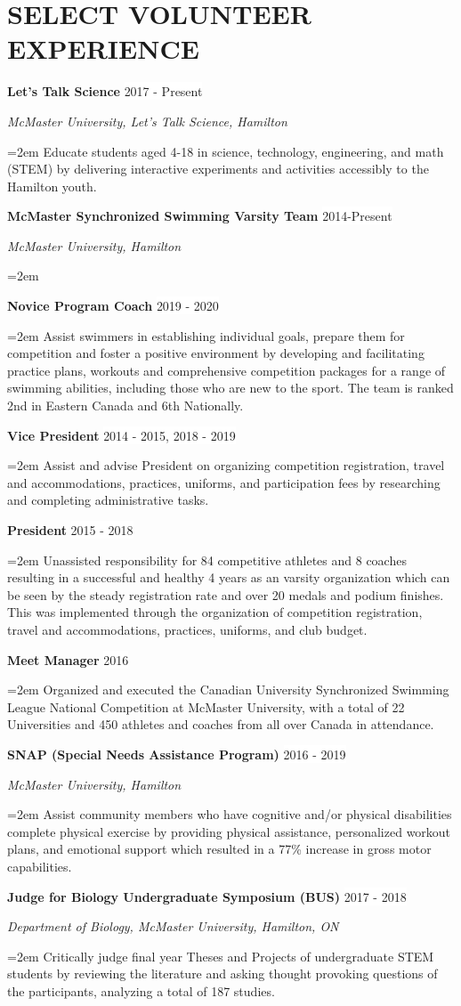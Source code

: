 \documentclass[paper=a4,fontsize=11pt]{scrartcl}	 			%
\newcommand{\NewPart}[1]{\section*{\uppercase{#1}}}
\newcommand{\EducationEntry}[4]{
		\noindent \textbf{#1} \hfill 					%
		\colorbox{White}{%
			\parbox{10em}{%
			\hfill\color{Black}#2}} \par				%
		\noindent \textit{#3} \par					%
		\noindent\hangindent=2em\hangafter=0 \small #4 	%
		\normalsize \par}
\newcommand{\WorkEntry}[4]{						%
		\noindent \textbf{#1} \hfill 					%
		\colorbox{White}{\color{Black}#2} \par		%
		\noindent \textit{#3} \par					%
		\noindent\hangindent=2em\hangafter=0 \small #4 	%
		\normalsize \par}
\newcommand{\WorkEntryB}[3]{						%
	\noindent \textbf{#1} \hfill 					%
	\colorbox{White}{\color{Black}#2} \par		%
	\noindent \textit{#3} \par					%
	\noindent\hangindent=2em\hangafter=0 \small  	%
	\normalsize \par}
\newcommand{\WorkEntryD}[3]{						%
	\indent \textbf{#1} \hfill 					%
	\colorbox{White}{\color{Black}#2} \par		%
	\hangindent=2em\hangafter=0 \small  #3 \par
    \normalsize }
\begin{document}
\NewPart{Select Volunteer Experience}{}
\WorkEntry{Let's Talk Science}{2017 - Present}{McMaster University, Let's Talk Science, Hamilton}{Educate students aged 4-18 in science, technology, engineering, and math (STEM) by delivering interactive experiments and activities accessibly to the Hamilton youth.}
\WorkEntryB{McMaster Synchronized Swimming Varsity Team}{2014-Present}{McMaster University, Hamilton}
	\WorkEntryD{Novice Program Coach}{2019 - 2020}{
		\noindent Assist swimmers in establishing individual goals, prepare them for competition and foster a positive environment by developing and facilitating practice plans, workouts and comprehensive competition packages for a range of swimming abilities, including those who are new to the sport. The team is ranked 2nd in Eastern Canada and 6th Nationally.}
	\WorkEntryD{Vice President}{2014 - 2015, 2018 - 2019}{
		\noindent Assist and advise President on organizing competition registration, travel and accommodations, practices, uniforms, and participation fees by researching and completing administrative tasks.}
	\WorkEntryD{President}{2015 - 2018}{
				\noindent Unassisted responsibility for 84 competitive athletes and 8 coaches resulting in a successful and healthy 4 years as an varsity organization which can be seen by the steady registration rate and over 20 medals and podium finishes. This was implemented through the organization of competition registration, travel and accommodations, practices, uniforms, and club budget.}
	\WorkEntryD{Meet Manager}{2016}{
		\noindent Organized and executed the Canadian University Synchronized Swimming League National Competition at McMaster University, with a total of 22 Universities and 450 athletes and coaches from all over Canada in attendance.}

\WorkEntry{SNAP (Special Needs Assistance Program)}{2016 - 2019}{McMaster University, Hamilton}{Assist community members who have cognitive and/or physical disabilities complete physical exercise by providing physical assistance, personalized workout plans, and emotional support which resulted in a 77\% increase in gross motor capabilities.}
\WorkEntry{Judge for Biology Undergraduate Symposium (BUS)}{2017 - 2018}{Department of Biology, McMaster University, Hamilton, ON}{Critically judge final year Theses and Projects of undergraduate STEM students by reviewing the literature and asking thought provoking questions of the participants, analyzing a total of 187 studies.}
\end{document}
